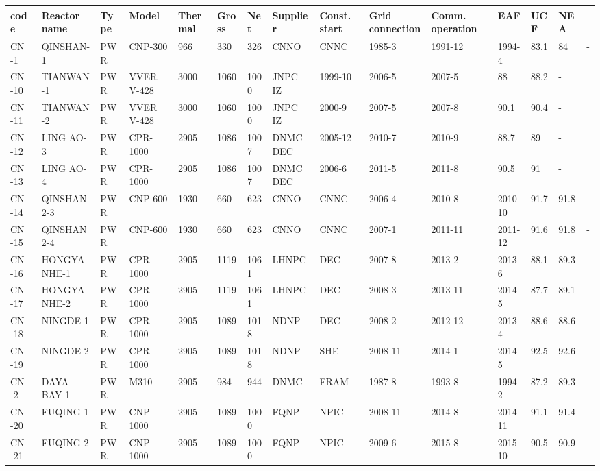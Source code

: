 \begin{table}
    \centering
    \begin{tabular}{|l|l|l|l|l|l|l|l|l|l|l|l|l|l|}
    \hline
    code & Reactor name & Type & Model & Thermal & Gross & Net & Supplier & Const. start & Grid connection & Comm. operation & EAF & UCF & NEA \\ \hline
    CN -1 & QINSHAN-1 & PWR & CNP-300 & 966 & 330 & 326 & CNNO & CNNC & 1985-3 & 1991-12 & 1994-4 & 83.1 & 84 & - \\ \hline
    CN -10 & TIANWAN-1 & PWR & VVER V-428 & 3000 & 1060 & 1000 & JNPC IZ & 1999-10 & 2006-5 & 2007-5 & 88 & 88.2 & - \\ \hline
    CN -11 & TIANWAN-2 & PWR & VVER V-428 & 3000 & 1060 & 1000 & JNPC IZ & 2000-9 & 2007-5 & 2007-8 & 90.1 & 90.4 & - \\ \hline
    CN -12 & LING AO-3 & PWR & CPR-1000 & 2905 & 1086 & 1007 & DNMC DEC & 2005-12 & 2010-7 & 2010-9 & 88.7 & 89 & - \\ \hline
    CN -13 & LING AO-4 & PWR & CPR-1000 & 2905 & 1086 & 1007 & DNMC DEC & 2006-6 & 2011-5 & 2011-8 & 90.5 & 91 & - \\ \hline
    CN -14 & QINSHAN 2-3 & PWR & CNP-600 & 1930 & 660 & 623 & CNNO & CNNC & 2006-4 & 2010-8 & 2010-10 & 91.7 & 91.8 & - \\ \hline
    CN -15 & QINSHAN 2-4 & PWR & CNP-600 & 1930 & 660 & 623 & CNNO & CNNC & 2007-1 & 2011-11 & 2011-12 & 91.6 & 91.8 & - \\ \hline
    CN -16 & HONGYANHE-1 & PWR & CPR-1000 & 2905 & 1119 & 1061 & LHNPC & DEC & 2007-8 & 2013-2 & 2013-6 & 88.1 & 89.3 & - \\ \hline
    CN -17 & HONGYANHE-2 & PWR & CPR-1000 & 2905 & 1119 & 1061 & LHNPC & DEC & 2008-3 & 2013-11 & 2014-5 & 87.7 & 89.1 & - \\ \hline
    CN -18 & NINGDE-1 & PWR & CPR-1000 & 2905 & 1089 & 1018 & NDNP & DEC & 2008-2 & 2012-12 & 2013-4 & 88.6 & 88.6 & - \\ \hline
    CN -19 & NINGDE-2 & PWR & CPR-1000 & 2905 & 1089 & 1018 & NDNP & SHE & 2008-11 & 2014-1 & 2014-5 & 92.5 & 92.6 & - \\ \hline
    CN -2 & DAYA BAY-1 & PWR & M310 & 2905 & 984 & 944 & DNMC & FRAM & 1987-8 & 1993-8 & 1994-2 & 87.2 & 89.3 & - \\ \hline
    CN -20 & FUQING-1 & PWR & CNP-1000 & 2905 & 1089 & 1000 & FQNP & NPIC & 2008-11 & 2014-8 & 2014-11 & 91.1 & 91.4 & - \\ \hline
    CN -21 & FUQING-2 & PWR & CNP-1000 & 2905 & 1089 & 1000 & FQNP & NPIC & 2009-6 & 2015-8 & 2015-10 & 90.5 & 90.9 & - \\ \hline

\end{tabular}
\end{table}
